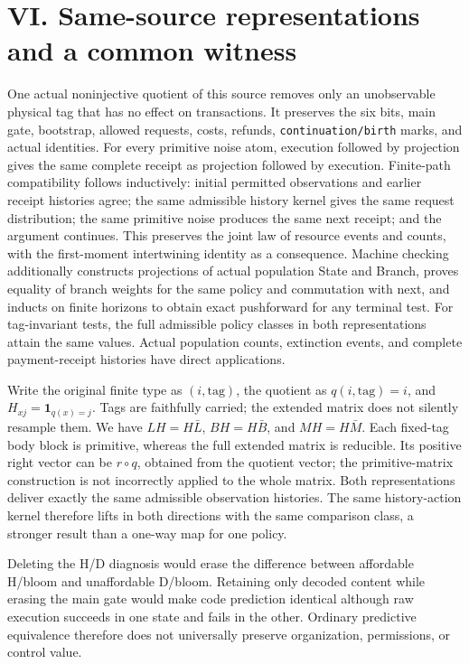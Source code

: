 \documentclass[
  english,
  11pt,
  oneside]{book}
\begin{document}
\section{VI. Same-source representations and a common witness}\label{vi.-same-source-representations-and-a-common-witness}

One actual noninjective quotient of this source removes only an unobservable physical tag that has no effect on transactions. It preserves the six bits, main gate, bootstrap, allowed requests, costs, refunds, \nolinkurl{continuation/birth} marks, and actual identities. For every primitive noise atom, execution followed by projection gives the same complete receipt as projection followed by execution. Finite-path compatibility follows inductively: initial permitted observations and earlier receipt histories agree; the same admissible history kernel gives the same request distribution; the same primitive noise produces the same next receipt; and the argument continues. This preserves the joint law of resource events and counts, with the first-moment intertwining identity as a consequence. Machine checking additionally constructs projections of actual population State and Branch, proves equality of branch weights for the same policy and commutation with next, and inducts on finite horizons to obtain exact pushforward for any terminal test. For tag-invariant tests, the full admissible policy classes in both representations attain the same values. Actual population counts, extinction events, and complete payment-receipt histories have direct applications.

Write the original finite type as \((i,\mathrm{tag})\), the quotient as \(q(i,\mathrm{tag})=i\), and \(H_{xj}=\mathbf1_{q(x)=j}\). Tags are faithfully carried; the extended matrix does not silently resample them. We have \(L H=H\bar L\), \(B H=H\bar B\), and \(M H=H\bar M\). Each fixed-tag body block is primitive, whereas the full extended matrix is reducible. Its positive right vector can be \(r\circ q\), obtained from the quotient vector; the primitive-matrix construction is not incorrectly applied to the whole matrix. Both representations deliver exactly the same admissible observation histories. The same history-action kernel therefore lifts in both directions with the same comparison class, a stronger result than a one-way map for one policy.

Deleting the H/D diagnosis would erase the difference between affordable H/bloom and unaffordable D/bloom. Retaining only decoded content while erasing the main gate would make code prediction identical although raw execution succeeds in one state and fails in the other. Ordinary predictive equivalence therefore does not universally preserve organization, permissions, or control value.
\end{document}
